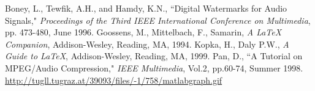\begin{thebibliography}{20}%
 Boney, L., Tewfik, A.H., and Hamdy, K.N., ``Digital
Watermarks for Audio Signals," \emph{Proceedings of the Third IEEE
International Conference on Multimedia}, pp. 473-480, June 1996.
 Goossens, M., Mittelbach, F., Samarin, \emph{A LaTeX
Companion}, Addison-Wesley, Reading, MA, 1994.
 Kopka, H., Daly P.W., \emph{A Guide to LaTeX},
Addison-Wesley, Reading, MA, 1999.
 Pan, D., ``A Tutorial on MPEG/Audio Compression," \emph{IEEE
Multimedia}, Vol.2, pp.60-74, Summer 1998.
 \url{http://tugll.tugraz.at/39093/files/-1/758/matlabgraph.gif}
\end{thebibliography}